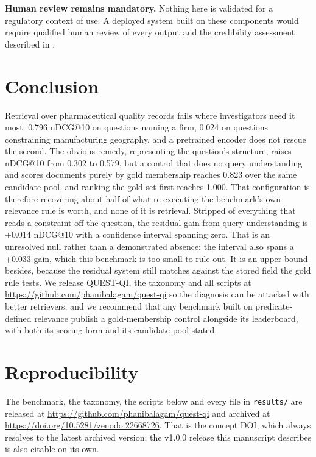 \documentclass[runningheads]{llncs}
\begin{document}
\textbf{Human review remains mandatory.} Nothing here is validated for a regulatory context of use. A deployed system built on these components would require qualified human review of every output and the credibility assessment described in \cite{fda_ai_credibility}.


\section{Conclusion}
Retrieval over pharmaceutical quality records fails where investigators need it most: 0.796 nDCG@10 on questions naming a firm, 0.024 on questions constraining manufacturing geography, and a pretrained encoder does not rescue the second. The obvious remedy, representing the question's structure, raises nDCG@10 from 0.302 to 0.579, but a control that does no query understanding and scores documents purely by gold membership reaches 0.823 over the same candidate pool, and ranking the gold set first reaches 1.000. That configuration is therefore recovering about half of what re-executing the benchmark's own relevance rule is worth, and none of it is retrieval. Stripped of everything that reads a constraint off the question, the residual gain from query understanding is +0.014 nDCG@10 with a confidence interval spanning zero. That is an unresolved null rather than a demonstrated absence: the interval also spans a +0.033 gain, which this benchmark is too small to rule out. It is an upper bound besides, because the residual system still matches against the stored field the gold rule tests. We release QUEST-QI, the taxonomy and all scripts at \url{https://github.com/phanibalagam/quest-qi} so the diagnosis can be attacked with better retrievers, and we recommend that any benchmark built on predicate-defined relevance publish a gold-membership control alongside its leaderboard, with both its scoring form and its candidate pool stated.


\section*{Reproducibility}
The benchmark, the taxonomy, the scripts below and every file in \texttt{results/} are released at \url{https://github.com/phanibalagam/quest-qi} and archived at \url{https://doi.org/10.5281/zenodo.22668726}. That is the concept DOI, which always resolves to the latest archived version; the v1.0.0 release this manuscript describes is also citable on its own.
\end{document}
